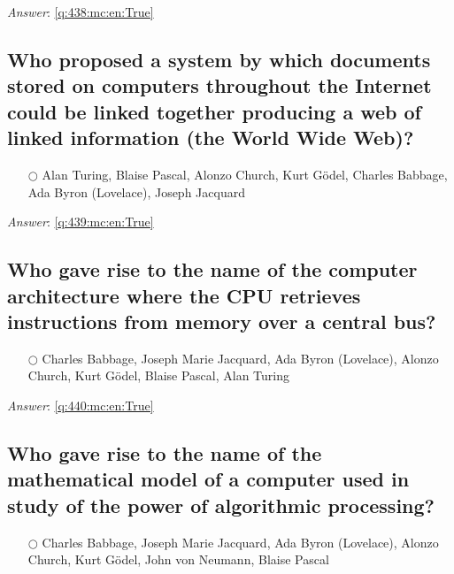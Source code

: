\documentclass[a4paper,11pt,oneside]{article}
\begin{document}
\begin{sloppypar}
\vspace{1cm}

\textit{Answer}: \autoref{q:438:mc:en:True}



\subsection{Who proposed a system by which documents stored on computers throughout the Internet could be linked together producing a web of linked information (the World Wide Web)?}

\label{q:439:mc:en:False}

\begin{itemize}
  \item[$\bigcirc$] Alan Turing, Blaise Pascal, Alonzo Church, Kurt G\"odel, Charles Babbage, Ada Byron (Lovelace), Joseph Jacquard
\end{itemize}

\vspace{1cm}

\textit{Answer}: \autoref{q:439:mc:en:True}



\subsection{Who gave rise to the name of the computer architecture where the CPU retrieves instructions from memory over a central bus?}

\label{q:440:mc:en:False}

\begin{itemize}
  \item[$\bigcirc$] Charles Babbage, Joseph Marie Jacquard, Ada Byron (Lovelace), Alonzo Church, Kurt G\"odel, Blaise Pascal, Alan Turing
\end{itemize}

\vspace{1cm}

\textit{Answer}: \autoref{q:440:mc:en:True}



\subsection{Who gave rise to the name of the mathematical model of a computer used in study of the power of algorithmic processing?}

\label{q:441:mc:en:False}

\begin{itemize}
  \item[$\bigcirc$] Charles Babbage, Joseph Marie Jacquard, Ada Byron (Lovelace), Alonzo Church, Kurt G\"odel, John von Neumann, Blaise Pascal
\end{itemize}


\end{sloppypar}
\end{document}
